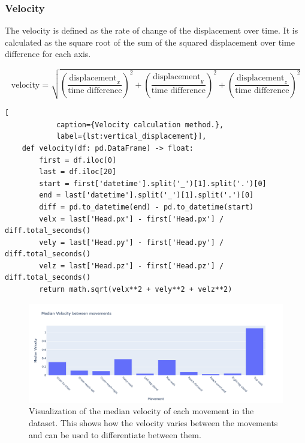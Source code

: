             \subsubsection{Velocity}
                
                The velocity is defined as the rate of change of the displacement over time. It is calculated as the square root of the sum of the squared displacement over time difference for each axis. 

                \begin{equation}\label{eq:velocity}
                    \text{velocity} = \sqrt{\left(\frac{\text{displacement}_x}{\text{time difference}}\right)^2 + \left(\frac{\text{displacement}_y}{\text{time difference}}\right)^2 + \left(\frac{\text{displacement}_z}{\text{time difference}}\right)^2}
                \end{equation}

                               
        \begin{lstlisting}[
            caption={Velocity calculation method.}, 
            label={lst:vertical_displacement}],     
    def velocity(df: pd.DataFrame) -> float:
        first = df.iloc[0]
        last = df.iloc[20]
        start = first['datetime'].split('_')[1].split('.')[0]
        end = last['datetime'].split('_')[1].split('.')[0]
        diff = pd.to_datetime(end) - pd.to_datetime(start)
        velx = last['Head.px'] - first['Head.px'] / diff.total_seconds()
        vely = last['Head.py'] - first['Head.py'] / diff.total_seconds()
        velz = last['Head.pz'] - first['Head.pz'] / diff.total_seconds()
        return math.sqrt(velx**2 + vely**2 + velz**2)
        \end{lstlisting}

                \begin{figure}[H]
                    \centering
                    \includegraphics[width=1.0\textwidth]{../src/resources/plots/feat-eng/median_velocity.png}
                    \caption{
                       Visualization of the median velocity of each movement in the dataset. This shows how the velocity varies between the movements and can be used to differentiate between them.
                    }
                    \label{fig:velocity}
                \end{figure}

